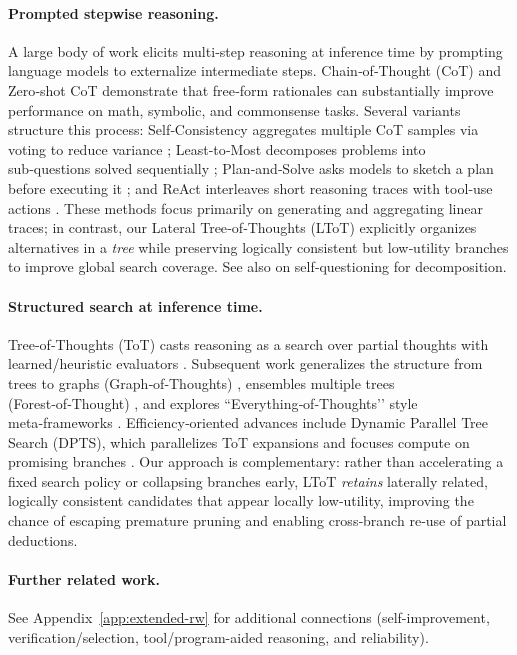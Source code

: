 \documentclass{article}
\begin{document}
\paragraph{Prompted stepwise reasoning.}
A large body of work elicits multi‑step reasoning at inference time by prompting language models to externalize intermediate steps. Chain‑of‑Thought (CoT) \citep{wei2022cot} and Zero‑shot CoT \citep{kojima2022zeroshotcot} demonstrate that free‑form rationales can substantially improve performance on math, symbolic, and commonsense tasks. Several variants structure this process: Self‑Consistency aggregates multiple CoT samples via voting to reduce variance \citep{wang2022selfconsistency}; Least‑to‑Most decomposes problems into sub‑questions solved sequentially \citep{zhou2022ltm}; Plan‑and‑Solve asks models to sketch a plan before executing it \citep{wang2023planandsolve}; and ReAct interleaves short reasoning traces with tool‑use actions \citep{yao2023react}. These methods focus primarily on generating and aggregating linear traces; in contrast, our Lateral Tree‑of‑Thoughts (LToT) explicitly organizes alternatives in a \emph{tree} while preserving logically consistent but low‑utility branches to improve global search coverage. See also \citet{press2022selfask} on self‑questioning for decomposition.

\paragraph{Structured search at inference time.}
Tree‑of‑Thoughts (ToT) casts reasoning as a search over partial thoughts with learned/heuristic evaluators \citep{yao2023tot}. Subsequent work generalizes the structure from trees to graphs (Graph‑of‑Thoughts) \citep{besta2024got}, ensembles multiple trees (Forest‑of‑Thought) \citep{bi2024fot}, and explores “Everything‑of‑Thoughts’’ style meta‑frameworks \citep{ding2023xot}. Efficiency‑oriented advances include Dynamic Parallel Tree Search (DPTS), which parallelizes ToT expansions and focuses compute on promising branches \citep{ding2025dpts}. Our approach is complementary: rather than accelerating a fixed search policy or collapsing branches early, LToT \emph{retains} laterally related, logically consistent candidates that appear locally low‑utility, improving the chance of escaping premature pruning and enabling cross‑branch re‑use of partial deductions.


\paragraph{Further related work.} See Appendix~\ref{app:extended-rw} for additional connections (self-improvement, verification/selection, tool/program-aided reasoning, and reliability).
\end{document}
